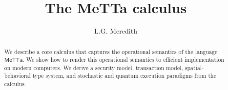 \def\lastname{Meredith}

\title{The MeTTa calculus}

\author{ L.G. Meredith }

\maketitle              %


\begin{abstract}

  We describe a core calculus that captures the operational semantics
  of the language $\mathsf{MeTTa}$. We show how to render this
  operational semantics to efficient implementation on modern
  computers. We derive a security model, transaction model,
  spatial-behavioral type system, and stochastic and quantum execution
  paradigms from the calculus.

\end{abstract}



